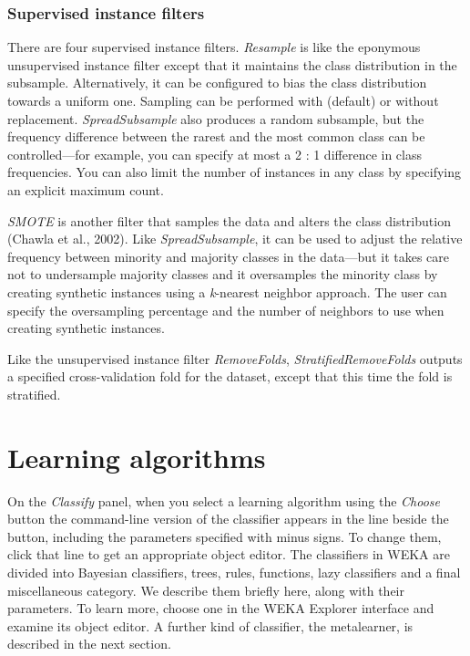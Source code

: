 \subsubsection{Supervised instance filters}

There are four supervised instance filters. \textit{Resample} is like
the eponymous unsupervised instance filter except that it maintains
the class distribution in the subsample. Alternatively, it can be
configured to bias the class distribution towards a uniform
one. Sampling can be performed with (default) or without
replacement. \textit{SpreadSubsample} also produces a random
subsample, but the frequency difference between the rarest and the
most common class can be controlled---for example, you can specify at
most a 2 : 1 difference in class frequencies. You can also limit the
number of instances in any class by specifying an explicit maximum
count.

\textit{SMOTE} is another filter that samples the data and alters the
class distribution (Chawla et al., 2002). Like
\textit{SpreadSubsample}, it can be used to adjust the relative
frequency between minority and majority classes in the data---but it
takes care not to undersample majority classes and it oversamples the
minority class by creating synthetic instances using a
\textit{k}-nearest neighbor approach. The user can specify the
oversampling percentage and the number of neighbors to use when
creating synthetic instances.

Like the unsupervised instance filter \textit{RemoveFolds},
\textit{StratifiedRemoveFolds} outputs a specified cross-validation
fold for the dataset, except that this time the fold is stratified.

\section{Learning algorithms}

On the \textit{Classify} panel, when you select a learning algorithm
using the \textit{Choose} button the command-line version of the
classifier appears in the line beside the button, including the
parameters specified with minus signs. To change them, click that line
to get an appropriate object editor. The classifiers in WEKA are
divided into Bayesian classifiers, trees, rules, functions, lazy
classifiers and a final miscellaneous category. We describe them
briefly here, along with their parameters. To learn more, choose one
in the WEKA Explorer interface and examine its object editor. A
further kind of classifier, the metalearner, is described in the next
section.

